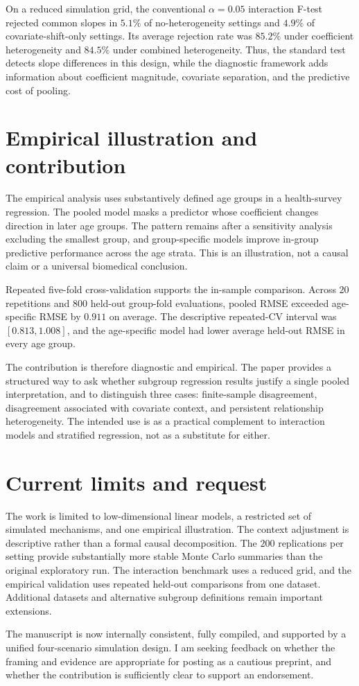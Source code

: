 \documentclass[10pt]{article}
\begin{document}
On a reduced simulation grid, the conventional $\alpha=0.05$ interaction F-test rejected common slopes in $5.1\%$ of no-heterogeneity settings and $4.9\%$ of covariate-shift-only settings. Its average rejection rate was $85.2\%$ under coefficient heterogeneity and $84.5\%$ under combined heterogeneity. Thus, the standard test detects slope differences in this design, while the diagnostic framework adds information about coefficient magnitude, covariate separation, and the predictive cost of pooling.

\section*{Empirical illustration and contribution}

The empirical analysis uses substantively defined age groups in a health-survey regression. The pooled model masks a predictor whose coefficient changes direction in later age groups. The pattern remains after a sensitivity analysis excluding the smallest group, and group-specific models improve in-group predictive performance across the age strata. This is an illustration, not a causal claim or a universal biomedical conclusion.

Repeated five-fold cross-validation supports the in-sample comparison. Across 20 repetitions and 800 held-out group-fold evaluations, pooled RMSE exceeded age-specific RMSE by $0.911$ on average. The descriptive repeated-CV interval was $[0.813, 1.008]$, and the age-specific model had lower average held-out RMSE in every age group.

The contribution is therefore diagnostic and empirical. The paper provides a structured way to ask whether subgroup regression results justify a single pooled interpretation, and to distinguish three cases: finite-sample disagreement, disagreement associated with covariate context, and persistent relationship heterogeneity. The intended use is as a practical complement to interaction models and stratified regression, not as a substitute for either.

\section*{Current limits and request}

The work is limited to low-dimensional linear models, a restricted set of simulated mechanisms, and one empirical illustration. The context adjustment is descriptive rather than a formal causal decomposition. The $200$ replications per setting provide substantially more stable Monte Carlo summaries than the original exploratory run. The interaction benchmark uses a reduced grid, and the empirical validation uses repeated held-out comparisons from one dataset. Additional datasets and alternative subgroup definitions remain important extensions.

The manuscript is now internally consistent, fully compiled, and supported by a unified four-scenario simulation design. I am seeking feedback on whether the framing and evidence are appropriate for posting as a cautious preprint, and whether the contribution is sufficiently clear to support an endorsement.
\end{document}
